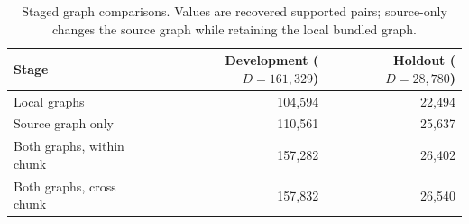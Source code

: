 \begin{table}[t]
\caption{Staged graph comparisons. Values are recovered supported pairs; source-only changes the source graph while retaining the local bundled graph.}
\label{tab:simulation-stages}
\centering\small
\begin{tabular}{lrr}
\toprule
Stage & Development ($D=161{,}329$) & Holdout ($D=28{,}780$)\\
\midrule
Local graphs & 104,594 & 22,494\\
Source graph only & 110,561 & 25,637\\
Both graphs, within chunk & 157,282 & 26,402\\
Both graphs, cross chunk & 157,832 & 26,540\\
\bottomrule
\end{tabular}
\end{table}
